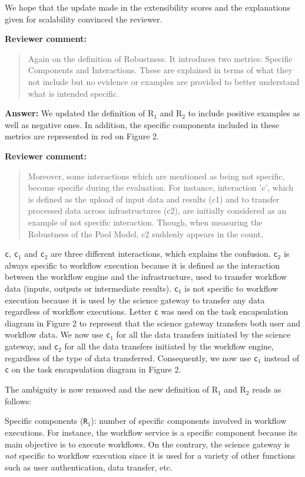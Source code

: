 \documentclass[a4]{article}
\newenvironment{review}%
{\textbf{Reviewer comment:}\begin{quote}}%
{\end{quote}}%
\newcommand{\answer}[1]{\textbf{Answer:} #1}
\newcommand{\revised}[1]{\color{blue} #1\color{black}}
\begin{document}
We hope that the update made in the extensibility scores and the
explanations given for scalability convinced the reviewer.

\begin{review}
  Again on the definition of Robustness. It introduces two metrics:
  Specific Components and Interactions. These are explained in terms
  of what they not include but no evidence or examples are provided to
  better understand what is intended specific. 
\end{review}

\answer{We updated the definition of R$_1$ and R$_2$ to include
  positive examples as well as negative ones. In addition, the
  specific components included in these metrics are represented in red
  on Figure 2.}

\begin{review}
Moreover, some
  interactions which are mentioned as being not specific, become
  specific during the evaluation. For instance, interaction 'c', which
  is defined as the upload of input data and results (c1) and to
  transfer processed data across infrastructures (c2), are initially
  considered as an example of not specific interaction. Though, when
  measuring the Robustness of the Pool Model, c2 suddenly appears in
  the count, 
\end{review}

\texttt{c}, \texttt{c$_1$} and \texttt{c$_2$} are three different
interactions, which explains the confusion. \texttt{c$_2$} is always
specific to workflow execution because it is defined as the
interaction between the workflow engine and the infrastructure, used
to transfer workflow data (inputs, outputs or intermediate
results). \texttt{c$_1$} is not specific to workflow execution because
it is used by the science gateway to transfer any data regardless of
workflow executions. Letter \texttt{c} was used on the task
encapsulation diagram in Figure 2 to represent that the science gateway transfers
both user and workflow data. We now use \texttt{c$_1$} for all the
data transfers initiated by the science gateway, and \texttt{c$_2$}
for all the data transfers initiated by the workflow engine,
regardless of the type of data transferred. Consequently, we now use
\texttt{c$_1$} instead of \texttt{c} on the task encapsulation diagram in Figure 2.

The ambiguity is now removed and the new definition of R$_1$ and R$_2$ reads as follows:

Specific components (\texttt{R$_1$}): number of specific components involved in workflow executions. \revised{For instance, the
  workflow service is a specific component because its main objective
  is to execute workflows. On the contrary, the science gateway is
  \emph{not} specific to workflow execution since it is used for a
  variety of other functions such as user authentication, data
  transfer, etc.}
\end{document}
